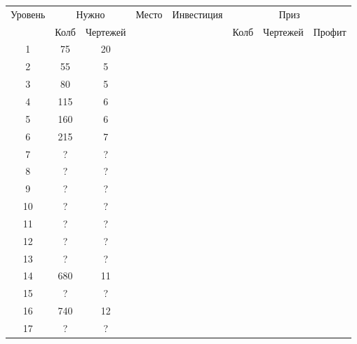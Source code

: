 \begin{longtable}[c]{|c|c|c|c|c|c|c|c|}
    \hline
    \multirow{ 2}{*}{\small Уровень} &
    \multicolumn{2}{|c|}{\small Нужно} &
    \multirow{ 2}{*}{\small Место} & 
    \multirow{ 2}{*}{\small Инвестиция} & 
    \multicolumn{3}{|c|}{\small Приз} \\\cline{2-3}\cline{6-8}
    &
    {\small Колб} & 
    {\small Чертежей} & 
    & &
    {\small Колб} & 
    {\small Чертежей} & 
    {\small Профит}
    \\\hline\endhead
    \multirow{1}{*}{1} & \multirow{1}{*}{75} & \multirow{1}{*}{20} & & & & & \\\hline
    \multirow{1}{*}{2} & \multirow{1}{*}{55} & \multirow{1}{*}{5} & & & & & \\\hline
    \multirow{1}{*}{3} & \multirow{1}{*}{80} & \multirow{1}{*}{5} & & & & & \\\hline
    \multirow{1}{*}{4} & \multirow{1}{*}{115} & \multirow{1}{*}{6} & & & & & \\\hline
    \multirow{1}{*}{5} & \multirow{1}{*}{160} & \multirow{1}{*}{6} & & & & & \\\hline
    \multirow{1}{*}{6} & \multirow{1}{*}{215} & \multirow{1}{*}{7} & & & & & \\\hline
    \multirow{1}{*}{7} & \multirow{1}{*}{?} & \multirow{1}{*}{?} & & & & & \\\hline
    \multirow{1}{*}{8} & \multirow{1}{*}{?} & \multirow{1}{*}{?} & & & & & \\\hline
    \multirow{1}{*}{9} & \multirow{1}{*}{?} & \multirow{1}{*}{?} & & & & & \\\hline
    \multirow{1}{*}{10} & \multirow{1}{*}{?} & \multirow{1}{*}{?} & & & & & \\\hline
    \multirow{1}{*}{11} & \multirow{1}{*}{?} & \multirow{1}{*}{?} & & & & & \\\hline
    \multirow{1}{*}{12} & \multirow{1}{*}{?} & \multirow{1}{*}{?} & & & & & \\\hline
    \multirow{1}{*}{13} & \multirow{1}{*}{?} & \multirow{1}{*}{?} & & & & & \\\hline
    \multirow{1}{*}{14} & \multirow{1}{*}{680} & \multirow{1}{*}{11} & & & & & \\\hline
    \multirow{1}{*}{15} & \multirow{1}{*}{?} & \multirow{1}{*}{?} & & & & & \\\hline
    \multirow{1}{*}{16} & \multirow{1}{*}{740} & \multirow{1}{*}{12} & & & & & \\\hline
    \multirow{1}{*}{17} & \multirow{1}{*}{?} & \multirow{1}{*}{?} & & & & & \\\hline

\end{longtable}
